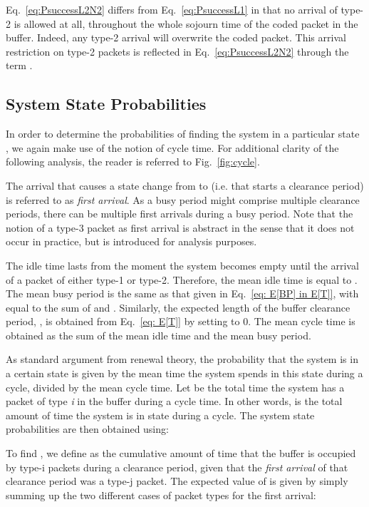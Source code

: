 \documentclass[preprint,12pt]{elsarticle}
\theoremstyle{definition}
\theoremstyle{plain}
\theoremstyle{remark}
\begin{document}
Eq.~\eqref{eq:PsuccessL2N2} differs from Eq.~\eqref{eq:PsuccessL1} in that no arrival of type-2 is allowed at all, throughout the whole sojourn time of the coded packet in the buffer. Indeed, any type-2 arrival will overwrite the coded packet. This arrival restriction on type-2 packets is reflected in Eq.~\eqref{eq:PsuccessL2N2} through the term .

\subsection*{System State Probabilities}

In order to determine the probabilities  of finding the system in a particular state , we again make use of the notion of cycle time. For additional clarity of the following analysis, the reader is referred to Fig.~\ref{fig:cycle}.

The arrival that causes a state change from  to  (i.e. that starts a clearance period) is referred to as \textit{first arrival}. As a busy period might comprise multiple clearance periods, there can be multiple first arrivals during a busy period. Note that the notion of a type-3 packet as first arrival is abstract in the sense that it does not occur in practice, but is introduced for analysis purposes.

The idle time lasts from the moment the system becomes empty until the arrival of a packet of either type-1 or type-2. Therefore, the mean idle time is equal to . The mean busy period is the same as that given in Eq.~\eqref{eq: E[BP] in E[T]}, with  equal to the sum of  and . Similarly, the expected length of the buffer clearance period, , is obtained from Eq.~\eqref{eq: E[T]} by setting  to 0. The mean cycle time  is obtained as the sum of the mean idle time and the mean busy period.

As standard argument from renewal theory, the probability that the system is in a certain state is given by the mean time the system spends in this state during a cycle, divided by the mean cycle time. Let \textit{} be the total time the system has a packet of type \textit{i} in the buffer during a cycle time. In other words,  is the total amount of time the system is in state  during a cycle.
The system state probabilities are then obtained using:

     

    

    

To find , we define \textit{} as the cumulative amount of time that the buffer is occupied by type-i packets during a clearance period, given that the \textit{first arrival} of that clearance period was a type-j packet. The expected value of \textit{} is given by simply summing up the two different cases of packet types for the first arrival:
    
\end{document}
